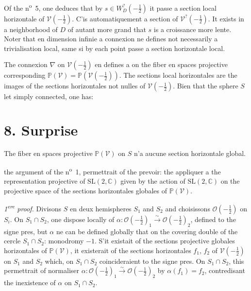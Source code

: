 \documentclass[12pt,a4paper]{article}
\theoremstyle{plain}
\theoremstyle{definition}
\theoremstyle{remark}
\begin{document}
Of the n\textsuperscript{o}~5, one deduces that by $s \in W_D^?(-\frac{1}{2})$ it passe a section local horizontale of $\mathscr{V}(-\frac{1}{2})$. C'is automatiquement a section of $\mathscr{V}^?(-\frac{1}{2})$. It exists in a neighborhood of $D$ of autant more grand that $s$ is a croissance more lente. Noter that en dimension infinie a connexion ne defines not necessarily a trivialisation local, same si by each point passe a section horizontale local.

The connexion $\nabla$ on $\mathscr{V}(-\frac{1}{2})$ en defines a on the fiber en spaces projective corresponding $\mathbb{P}(\mathscr{V}) = \mathbb{P}(\mathscr{V}(-\frac{1}{2}))$. The sections local horizontales are the images of the sections horizontales not nulles of $\mathscr{V}(-\frac{1}{2})$. Bien that the sphere $S$ let simply connected, one has:

\section*{8. Surprise}

The fiber en spaces projective $\mathbb{P}(\mathscr{V})$ on $S$ n'a aucune section horizontale global.

the argument of the n\textsuperscript{o}~1, permettrait of the prevoir: the appliquer a the representation projective of $\mathrm{SL}(2, \mathbb{C})$ given by the action of $\mathrm{SL}(2, \mathbb{C})$ on the projective space of the sections horizontales globales of $\mathbb{P}(\mathscr{V})$.

\medskip
\noindent\textit{1\textsuperscript{ere} proof.} Divisons $S$ en deux hemispheres $S_1$ and $S_2$ and choisissons $\mathcal{O}(-\frac{1}{2})$ on $S_i$. On $S_1 \cap S_2$, one dispose locally of $\alpha \colon \mathcal{O}(-\frac{1}{2})_1 \xrightarrow{\sim} \mathcal{O}(-\frac{1}{2})_2$, defined to the signe pres, but $\alpha$ ne can be defined globally that on the covering double of the cercle $S_1 \cap S_2$: monodromy $-1$. S'it existait of the sections projective globales horizontales of $\mathbb{P}(\mathscr{V})$, it existerait of the sections horizontales $f_1$, $f_2$ of $\mathscr{V}(-\frac{1}{2})$ on $S_1$ and $S_2$ which, on $S_1 \cap S_2$ coincideraient to the signe pres. On $S_1 \cap S_2$, this permettrait of normaliser $\alpha \colon \mathcal{O}(-\frac{1}{2})_1 \xrightarrow{\sim} \mathcal{O}(-\frac{1}{2})_2$ by $\alpha(f_1) = f_2$, contredisant the inexistence of $\alpha$ on $S_1 \cap S_2$.
\end{document}
